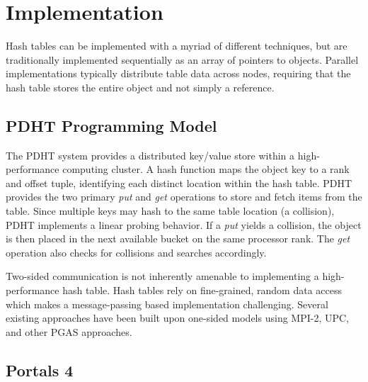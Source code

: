 \section{Implementation}

Hash tables can be implemented with a myriad of different techniques,
but are traditionally implemented sequentially as an array of pointers to
objects. Parallel implementations typically distribute table data
across nodes, requiring that the hash table stores the entire object
and not simply a reference. 

\subsection{PDHT Programming Model}


 
The PDHT system provides a distributed key/value store within a
high-performance computing cluster. A hash function maps the object
key to a rank and offset tuple, identifying each distinct location
within the hash table. PDHT provides the two primary {\em put} and
{\em get} operations to store and fetch items from the table. Since
multiple keys may hash to the same table location (a collision), PDHT
implements a linear probing behavior. If a {\em put} yields a
collision, the object is then placed in the next available bucket on
the same processor rank. The {\em get} operation also checks for
collisions and searches accordingly. 

Two-sided communication is not inherently amenable to implementing a
high-performance hash table. Hash tables rely on fine-grained, random
data access which makes a message-passing based implementation
challenging. Several existing approaches have been built upon
one-sided models using MPI-2, UPC, and other PGAS approaches.

\subsection{Portals 4}

